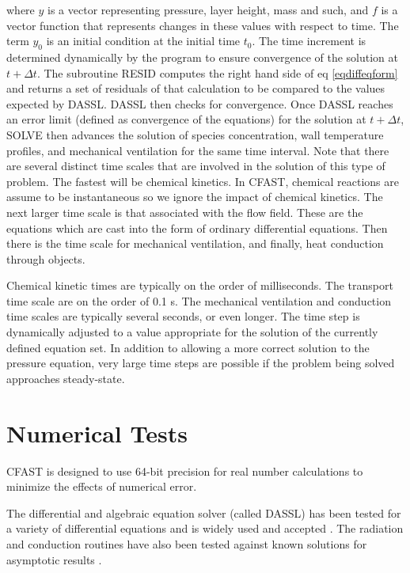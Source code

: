 where $y$ is a vector representing pressure, layer height, mass and such, and $f$ is a vector function that represents changes in these values with respect to time. The term $y_0$ is an initial condition at
the initial time $t_0$. The time increment is determined dynamically by the program to ensure convergence of the solution at $t + \Delta t$. The subroutine RESID computes the right hand side of eq \ref{eqdiffeqform} and returns a set of residuals of that calculation to be compared to the values expected by DASSL. DASSL then checks for convergence. Once DASSL reaches an error limit (defined as convergence of the equations) for the solution at $t + \Delta t$, SOLVE then advances the solution of species concentration, wall temperature profiles, and mechanical ventilation for the same time interval.
Note that there are several distinct time scales that are involved in the solution of this type of
problem. The fastest will be chemical kinetics. In CFAST, chemical reactions are assume to be instantaneous so we ignore the impact of chemical kinetics.  The next larger time scale is that associated with the flow field. These are the equations which are cast into the form of ordinary differential equations. Then there is the time scale for mechanical ventilation, and finally, heat conduction through objects.

Chemical kinetic times are typically on the order of milliseconds. The transport time scale are
on the order of 0.1 s. The mechanical ventilation and conduction time scales are typically
several seconds, or even longer. The time step is dynamically adjusted to a value appropriate for
the solution of the currently defined equation set. In addition to allowing a more correct solution
to the pressure equation, very large time steps are possible if the problem being solved
approaches steady-state.

\section{Numerical Tests}

CFAST is designed to use 64-bit precision for real number calculations to minimize the effects of numerical error.

The differential and algebraic equation solver (called DASSL) has been tested for a variety of differential equations and is widely used and accepted \cite{DASSL}.  The radiation and conduction routines have also been tested against known solutions for asymptotic results \cite{Forney_radiation}.

